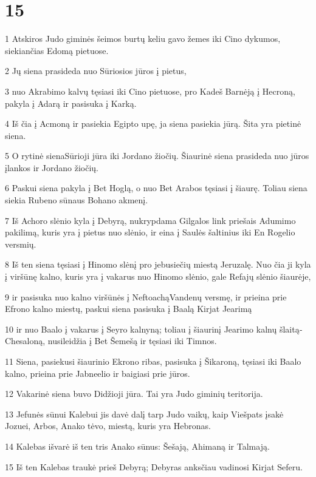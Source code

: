 \chapter{15}

\par 1 Atskiros Judo giminės šeimos burtų keliu gavo žemes iki Cino dykumos, siekiančias Edomą pietuose. 
\par 2 Jų siena prasideda nuo Sūriosios jūros į pietus, 
\par 3 nuo Akrabimo kalvų tęsiasi iki Cino pietuose, pro Kadeš Barnėją į Hecroną, pakyla į Adarą ir pasisuka į Karką. 
\par 4 Iš čia į Acmoną ir pasiekia Egipto upę, ja siena pasiekia jūrą. Šita yra pietinė siena. 
\par 5 O rytinė siena­Sūrioji jūra iki Jordano žiočių. Šiaurinė siena prasideda nuo jūros įlankos ir Jordano žiočių. 
\par 6 Paskui siena pakyla į Bet Hoglą, o nuo Bet Arabos tęsiasi į šiaurę. Toliau siena siekia Rubeno sūnaus Bohano akmenį. 
\par 7 Iš Achoro slėnio kyla į Debyrą, nukrypdama Gilgalos link priešais Adumimo pakilimą, kuris yra į pietus nuo slėnio, ir eina į Saulės šaltinius iki En Rogelio versmių. 
\par 8 Iš ten siena tęsiasi į Hinomo slėnį pro jebusiečių miestą Jeruzalę. Nuo čia ji kyla į viršūnę kalno, kuris yra į vakarus nuo Hinomo slėnio, gale Refajų slėnio šiaurėje, 
\par 9 ir pasisuka nuo kalno viršūnės į Neftoachą­Vandenų versmę, ir prieina prie Efrono kalno miestų, paskui siena pasisuka į Baalą­ Kirjat Jearimą 
\par 10 ir nuo Baalo į vakarus į Seyro kalnyną; toliau į šiaurinį Jearimo kalnų šlaitą­Chesaloną, nusileidžia į Bet Šemešą ir tęsiasi iki Timnos. 
\par 11 Siena, pasiekusi šiaurinio Ekrono ribas, pasisuka į Šikaroną, tęsiasi iki Baalo kalno, prieina prie Jabneelio ir baigiasi prie jūros. 
\par 12 Vakarinė siena buvo Didžioji jūra. Tai yra Judo giminių teritorija. 
\par 13 Jefunės sūnui Kalebui jis davė dalį tarp Judo vaikų, kaip Viešpats įsakė Jozuei, Arbos, Anako tėvo, miestą, kuris yra Hebronas. 
\par 14 Kalebas išvarė iš ten tris Anako sūnus: Šešają, Ahimaną ir Talmają. 
\par 15 Iš ten Kalebas traukė prieš Debyrą; Debyras anksčiau vadinosi Kirjat Seferu. 
